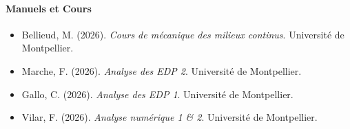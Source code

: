 

\nocite{*}
\printbibliography

\paragraph{Manuels et Cours}
\begin{itemize}
    \item Bellieud, M. (2026). \textit{Cours de mécanique des milieux continus}. Université de Montpellier.
    \item Marche, F. (2026). \textit{Analyse des EDP 2}. Université de Montpellier.
    \item Gallo, C. (2026). \textit{Analyse des EDP 1}. Université de Montpellier.
    \item Vilar, F. (2026). \textit{Analyse numérique 1 \& 2}. Université de Montpellier.
\end{itemize}

